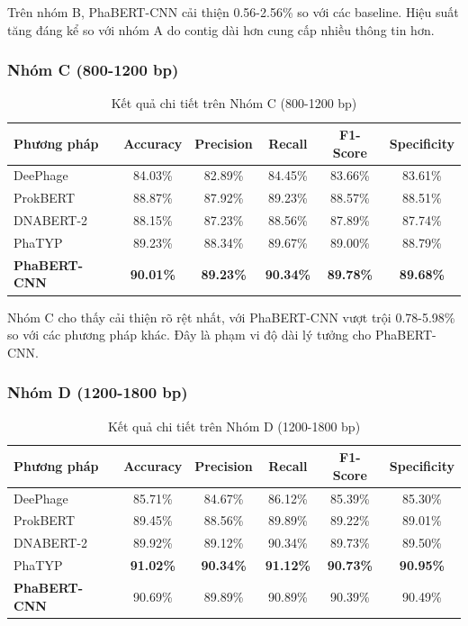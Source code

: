 Trên nhóm B, PhaBERT-CNN cải thiện 0.56-2.56\% so với các baseline. Hiệu suất tăng đáng kể so với nhóm A do contig dài hơn cung cấp nhiều thông tin hơn.

\subsubsection{Nhóm C (800-1200 bp)}

\begin{table}[h]
\centering
\caption{Kết quả chi tiết trên Nhóm C (800-1200 bp)}
\label{tab:group_c_results}
\begin{tabular}{lccccc}
\toprule
\textbf{Phương pháp} & \textbf{Accuracy} & \textbf{Precision} & \textbf{Recall} & \textbf{F1-Score} & \textbf{Specificity} \\
\midrule
DeePhage & 84.03\% & 82.89\% & 84.45\% & 83.66\% & 83.61\% \\
ProkBERT & 88.87\% & 87.92\% & 89.23\% & 88.57\% & 88.51\% \\
DNABERT-2 & 88.15\% & 87.23\% & 88.56\% & 87.89\% & 87.74\% \\
PhaTYP & 89.23\% & 88.34\% & 89.67\% & 89.00\% & 88.79\% \\
\midrule
\textbf{PhaBERT-CNN} & \textbf{90.01\%} & \textbf{89.23\%} & \textbf{90.34\%} & \textbf{89.78\%} & \textbf{89.68\%} \\
\bottomrule
\end{tabular}
\end{table}

Nhóm C cho thấy cải thiện rõ rệt nhất, với PhaBERT-CNN vượt trội 0.78-5.98\% so với các phương pháp khác. Đây là phạm vi độ dài lý tưởng cho PhaBERT-CNN.

\subsubsection{Nhóm D (1200-1800 bp)}

\begin{table}[h]
\centering
\caption{Kết quả chi tiết trên Nhóm D (1200-1800 bp)}
\label{tab:group_d_results}
\begin{tabular}{lccccc}
\toprule
\textbf{Phương pháp} & \textbf{Accuracy} & \textbf{Precision} & \textbf{Recall} & \textbf{F1-Score} & \textbf{Specificity} \\
\midrule
DeePhage & 85.71\% & 84.67\% & 86.12\% & 85.39\% & 85.30\% \\
ProkBERT & 89.45\% & 88.56\% & 89.89\% & 89.22\% & 89.01\% \\
DNABERT-2 & 89.92\% & 89.12\% & 90.34\% & 89.73\% & 89.50\% \\
PhaTYP & \textbf{91.02\%} & \textbf{90.34\%} & \textbf{91.12\%} & \textbf{90.73\%} & \textbf{90.95\%} \\
\midrule
\textbf{PhaBERT-CNN} & 90.69\% & 89.89\% & 90.89\% & 90.39\% & 90.49\% \\
\bottomrule
\end{tabular}
\end{table}

